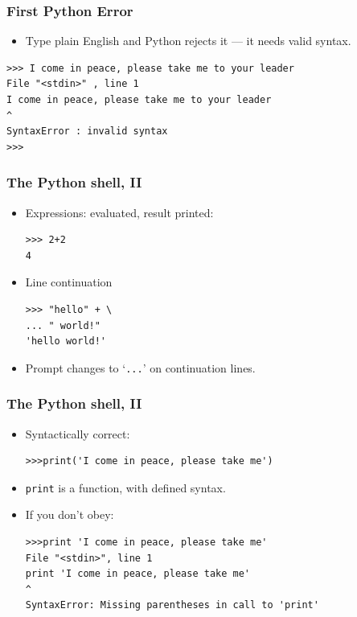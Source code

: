 \begin{frame}[fragile]  \frametitle{First Python Error}
  \begin{itemize}
 \item Type plain English and Python rejects it --- it needs valid syntax.
\end{itemize}

\begin{lstlisting}
>>> I come in peace, please take me to your leader
File "<stdin>" , line 1
I come in peace, please take me to your leader
^
SyntaxError : invalid syntax
>>>
\end{lstlisting}
\end{frame}

\begin{frame}[fragile]\frametitle{The Python shell, II}
\begin{itemize}
\item Expressions: evaluated, result printed:
\begin{lstlisting}
>>> 2+2
4
\end{lstlisting}
\item Line continuation \\ 
\begin{lstlisting}
>>> "hello" + \
... " world!"
'hello world!'
\end{lstlisting}
\item Prompt changes to `\texttt{...}' on continuation lines.
\end{itemize}
\end{frame}

\begin{frame}[fragile]\frametitle{The Python shell, II}
\begin{itemize}
\item Syntactically correct:
	\begin{lstlisting}
>>>print('I come in peace, please take me')
	\end{lstlisting}

\item \lstinline|print| is a function, with defined syntax. 
\item If you don't obey: \\ 
\begin{lstlisting}
>>>print 'I come in peace, please take me'
File "<stdin>", line 1
print 'I come in peace, please take me'
^
SyntaxError: Missing parentheses in call to 'print'
\end{lstlisting}
\end{itemize}
\end{frame}

